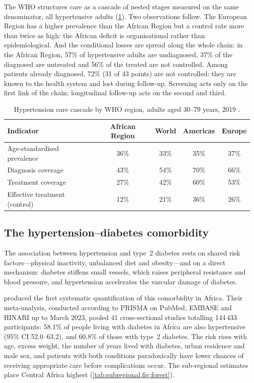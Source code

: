 The WHO structures care as a cascade of nested stages measured on the same denominator, all hypertensive adults (\cref{tab:cascade}). Two observations follow. The European Region has a higher prevalence than the African Region but a control rate more than twice as high: the African deficit is organisational rather than epidemiological. And the conditional losses are spread along the whole chain: in the African Region, 57\% of hypertensive adults are undiagnosed, 37\% of the diagnosed are untreated and 56\% of the treated are not controlled. Among patients already diagnosed, 72\% (31 of 43 points) are not controlled: they are known to the health system and lost during follow-up. Screening acts only on the first link of the chain; longitudinal follow-up acts on the second and third.

\begin{table}[htbp]
\centering\small
\caption{Hypertension care cascade by WHO region, adults aged 30--79 years, 2019 \parencite{who2023hypertension}.}\label{tab:cascade}
\begin{tabular}{@{}lcccc@{}}
\toprule
\textbf{Indicator} & \textbf{African Region} & \textbf{World} & \textbf{Americas} & \textbf{Europe} \\
\midrule
Age-standardised prevalence & 36\% & 33\% & 35\% & 37\% \\
Diagnosis coverage & 43\% & 54\% & 70\% & 66\% \\
Treatment coverage & 27\% & 42\% & 60\% & 53\% \\
Effective treatment (control) & 12\% & 21\% & 36\% & 26\% \\
\bottomrule
\end{tabular}
\end{table}

\subsection{The hypertension--diabetes comorbidity}\label{sec:comorbidity}

The association between hypertension and type~2 diabetes rests on shared risk factors---physical inactivity, unbalanced diet and obesity---and on a direct mechanism: diabetes stiffens small vessels, which raises peripheral resistance and blood pressure, and hypertension accelerates the vascular damage of diabetes.

\Textcite{hinneh2023} produced the first systematic quantification of this comorbidity in Africa. Their meta-analysis, conducted according to PRISMA on PubMed, EMBASE and HINARI up to March 2023, pooled 41 cross-sectional studies totalling 144\,433 participants: 58.1\% of people living with diabetes in Africa are also hypertensive (95\% CI 52.0--63.2), and 60.8\% of those with type~2 diabetes. The risk rises with age, excess weight, the number of years lived with diabetes, urban residence and male sex, and patients with both conditions paradoxically have lower chances of receiving appropriate care before complications occur. The sub-regional estimates place Central Africa highest (\cref{tab:subregional,fig:forest}).

